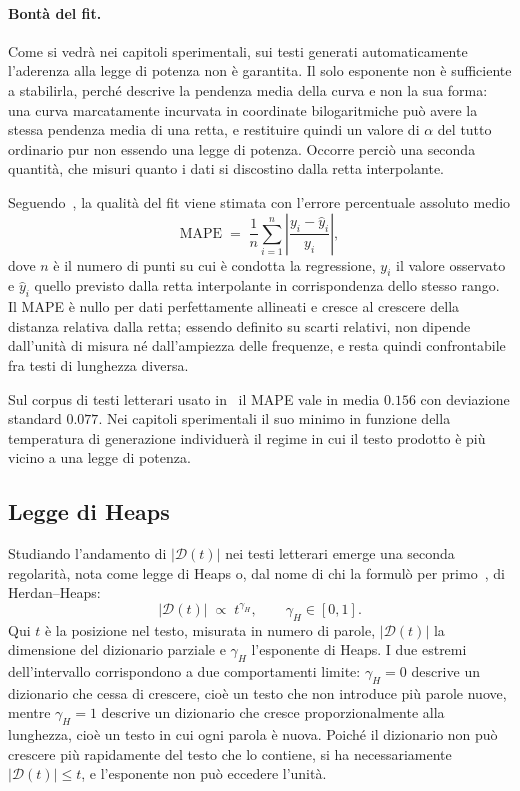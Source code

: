 \paragraph{Bontà del fit.}
Come si vedrà nei capitoli sperimentali, sui testi generati automaticamente
l'aderenza alla legge di potenza non è garantita. Il solo esponente non è
sufficiente a stabilirla, perché descrive la pendenza media della curva e non la
sua forma: una curva marcatamente incurvata in coordinate bilogaritmiche può
avere la stessa pendenza media di una retta, e restituire quindi un valore di
$\alpha$ del tutto ordinario pur non essendo una legge di potenza. Occorre
perciò una seconda quantità, che misuri quanto i dati si discostino dalla retta
interpolante.

Seguendo~\cite{mikhaylovskiy2025zipf}, la qualità del fit viene stimata con
l'errore percentuale assoluto medio
\begin{equation}
  \mathrm{MAPE} \;=\; \frac{1}{n}\sum_{i=1}^{n}
  \left| \frac{y_i - \hat{y}_i}{y_i} \right|,
  \label{eq:mape}
\end{equation}
dove $n$ è il numero di punti su cui è condotta la regressione, $y_i$ il valore
osservato e $\hat{y}_i$ quello previsto dalla retta interpolante in
corrispondenza dello stesso rango. Il MAPE è nullo per dati perfettamente
allineati e cresce al crescere della distanza relativa dalla retta;
essendo definito su scarti relativi, non dipende dall'unità di misura né
dall'ampiezza delle frequenze, e resta quindi confrontabile fra testi di
lunghezza diversa.

Sul corpus di testi letterari usato in~\cite{mikhaylovskiy2025zipf} il MAPE vale
in media $0.156$ con deviazione standard $0.077$. Nei capitoli sperimentali il
suo minimo in funzione della temperatura di generazione individuerà il regime in
cui il testo prodotto è più vicino a una legge di potenza.

\subsection{Legge di Heaps}
\label{sec:heaps}

Studiando l'andamento di $|\mathcal{D}(t)|$ nei testi letterari emerge una
seconda regolarità, nota come legge di Heaps o, dal nome di chi la formulò per
primo~\cite{herdan1964}, di Herdan--Heaps:
\begin{equation}
  |\mathcal{D}(t)| \;\propto\; t^{\gamma_H}, \qquad \gamma_H \in [0,1] .
  \label{eq:heaps}
\end{equation}
Qui $t$ è la posizione nel testo, misurata in numero di parole,
$|\mathcal{D}(t)|$ la dimensione del dizionario parziale e $\gamma_H$
l'esponente di Heaps. I due estremi dell'intervallo corrispondono a due
comportamenti limite: $\gamma_H = 0$ descrive un dizionario che cessa di
crescere, cioè un testo che non introduce più parole nuove, mentre
$\gamma_H = 1$ descrive un dizionario che cresce proporzionalmente alla
lunghezza, cioè un testo in cui ogni parola è nuova. Poiché il dizionario non
può crescere più rapidamente del testo che lo contiene, si ha necessariamente
$|\mathcal{D}(t)| \le t$, e l'esponente non può eccedere l'unità.

